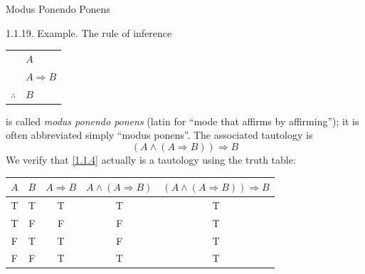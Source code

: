 \documentclass[smaller,hyperref={CJKbookmarks=true}]{beamer}
\begin{document}
\begin{frame}[t]{Modus Ponendo Ponens}
\begin{spacing}{1.05}
\alert{1.1.19. Example.} The rule of inference
\begin{center}
 \begin{tabular}{cl}
    & $A$ \\
    & $A\Rightarrow B$ \\ \cmidrule{2-2}
   $\therefore$ & $B$ \\
 \end{tabular}
\end{center}
is called \emph{modus ponendo ponens} (latin for ``mode that af{}firms by af{}firming''); it is often abbreviated simply ``modus ponens''. The associated tautology is
\begin{equation}\label{1.1.4}
  \left(A\wedge(A\Rightarrow B)\right)\Rightarrow B
\end{equation}
We verify that \eqref{1.1.4} actually is a tautology using the truth table:
\begin{center}
  \begin{tabular}{c|c||c|c|c}
    $A$ & $B$ & $A\Rightarrow B$ & $A\wedge(A\Rightarrow B)$ & $\left(A\wedge(A\Rightarrow B)\right)\Rightarrow B$ \\ \hline
    T & T & T & T & T \\
    T & F & F & F & T \\
    F & T & T & F & T \\
    F & F & T & T & T \\
  \end{tabular}
\end{center}
\end{spacing}
\end{frame}
\end{document}
